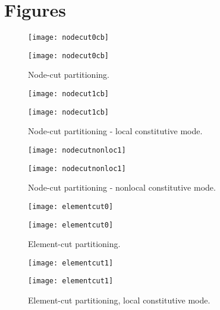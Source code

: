\documentclass[a4paper]{report}
\begin{document}
\section{Figures}

\begin{figure}[htb]
\begin{htmlonly}
  \centerline{\texttt{[image: nodecut0cb]}}
\end{htmlonly}
\centerline{\texttt{[image: nodecut0cb]}}
\caption{Node-cut partitioning.}
\label{nodecut}
\end{figure}

\begin{figure}[htb]
\begin{htmlonly}
  \centerline{\texttt{[image: nodecut1cb]}}
\end{htmlonly}
\centerline{\texttt{[image: nodecut1cb]}}
\caption{Node-cut partitioning - local constitutive mode.}
\label{nodecut-lm}
\end{figure}

\begin{figure}[htb]
\begin{htmlonly}
  \centerline{\texttt{[image: nodecutnonloc1]}}
\end{htmlonly}
\centerline{\texttt{[image: nodecutnonloc1]}}
\caption{Node-cut partitioning - nonlocal constitutive mode.}
\label{nodecut-nlm}
\end{figure}


\begin{figure}[htb]
\begin{htmlonly}
  \centerline{\texttt{[image: elementcut0]}}
\end{htmlonly}
\centerline{\texttt{[image: elementcut0]}}
\caption{Element-cut partitioning.}
\label{elmentcut}
\end{figure}

\begin{figure}[htb]
\begin{htmlonly}
  \centerline{\texttt{[image: elementcut1]}}
\end{htmlonly}
\centerline{\texttt{[image: elementcut1]}}
\caption{Element-cut partitioning, local constitutive mode.}
\label{elmentcut-lm}
\end{figure}
\end{document}
